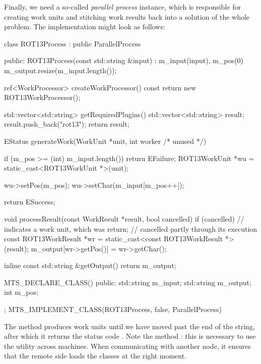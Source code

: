Finally, we need a so-called \emph{parallel process}
instance, which is responsible for creating work units and stitching
work results back into a solution of the whole problem. The 
implementation might look as follows:
\begin{cpp}
class ROT13Process : public ParallelProcess {
public:
    ROT13Process(const std::string &input) : m_input(input), m_pos(0) {
        m_output.resize(m_input.length());
    }

    ref<WorkProcessor> createWorkProcessor() const {
        return new ROT13WorkProcessor();
    }

    std::vector<std::string> getRequiredPlugins() {
        std::vector<std::string> result;
        result.push_back("rot13");
        return result;
    }

    EStatus generateWork(WorkUnit *unit, int worker /* unused */) {
        if (m_pos >= (int) m_input.length())
            return EFailure;
        ROT13WorkUnit *wu = static_cast<ROT13WorkUnit *>(unit);

        wu->setPos(m_pos);
        wu->setChar(m_input[m_pos++]);

        return ESuccess;
    }

    void processResult(const WorkResult *result, bool cancelled) {
        if (cancelled) // indicates a work unit, which was
            return;    // cancelled partly through its execution
        const ROT13WorkResult *wr =
            static_cast<const ROT13WorkResult *>(result);
        m_output[wr->getPos()] = wr->getChar();
    }

    inline const std::string &getOutput() {
        return m_output;
    }

    MTS_DECLARE_CLASS()
public:
    std::string m_input;
    std::string m_output;
    int m_pos;
};
MTS_IMPLEMENT_CLASS(ROT13Process, false, ParallelProcess)
\end{cpp}
The  method produces work units until we have moved past
the end of the string, after which it returns the status code .
Note the method : this is necessary to use
the utility across
machines. When communicating with another node, it ensures that the remote side
loads the  classes at the right moment.

